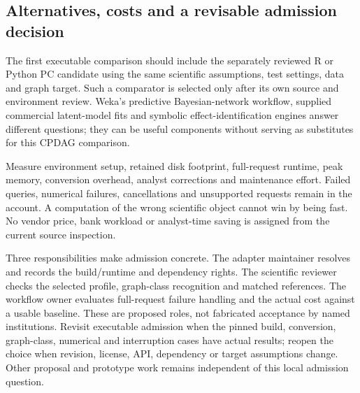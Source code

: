 \hypertarget{alternatives-costs-and-a-revisable-admission-decision}{%
\subsection{Alternatives, costs and a revisable admission
decision}\label{alternatives-costs-and-a-revisable-admission-decision}}

The first executable comparison should include the separately reviewed R
or Python PC candidate using the same scientific assumptions, test
settings, data and graph target. Such a comparator is selected only
after its own source and environment review. Weka's predictive
Bayesian-network workflow, supplied commercial latent-model fits and
symbolic effect-identification engines answer different questions; they
can be useful components without serving as substitutes for this CPDAG
comparison. \citep{exec13_java_tetrad,exec13_tetrad_reuse_decision}

Measure environment setup, retained disk footprint, full-request
runtime, peak memory, conversion overhead, analyst corrections and
maintenance effort. Failed queries, numerical failures, cancellations
and unsupported requests remain in the account. A computation of the
wrong scientific object cannot win by being fast. No vendor price, bank
workload or analyst-time saving is assigned from the current source
inspection.

Three responsibilities make admission concrete. The adapter maintainer
resolves and records the build/runtime and dependency rights. The
scientific reviewer checks the selected profile, graph-class recognition
and matched references. The workflow owner evaluates full-request
failure handling and the actual cost against a usable baseline. These
are proposed roles, not fabricated acceptance by named institutions.
Revisit executable admission when the pinned build, conversion,
graph-class, numerical and interruption cases have actual results;
reopen the choice when revision, license, API, dependency or target
assumptions change. Other proposal and prototype work remains
independent of this local admission question.
\citep{exec13_tetrad_reuse_decision} \label{exec13:tetrad-reuse-end}
